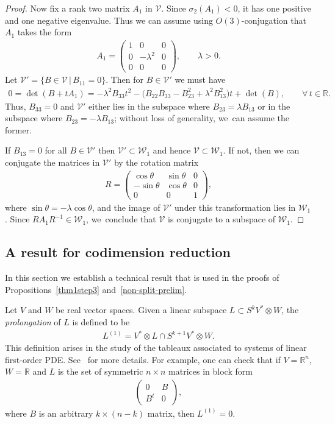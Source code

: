 \documentclass[10pt,a4paper]{amsart}
\def\R{\mathbb{R}}
\def\V{\mathscr{V}}
\def\W{\mathscr{W}}
\numberwithin{equation}{section}
\begin{document}
\begin{proof}
Now fix a rank two matrix $A_1$ in $\V$. Since $\sigma_2 (A_1) < 0$, it has one positive and one negative eigenvalue. Thus we can assume using $O(3)$-conjugation that $A_1$ takes the form
\begin{gather*}
A_1 = \begin{pmatrix} 1 & 0 & 0 \\ 0 & -\lambda^2 & 0 \\ 0 & 0 & 0 \end{pmatrix} , \qquad \lambda > 0.
\end{gather*}
Let $\V' = \{ B \in \V \,|\, B_{11}=0\}$. Then for $B \in \V'$ we must have
\begin{gather*}
0 = \det(B + t A_1) = -\lambda^2 B_{33}t^2 - \big(B_{22}B_{33} - B_{23}^2 + \lambda^2 B_{13}^2\big)t + \det(B), \qquad \forall\, t \in \R.
\end{gather*}
Thus, $B_{33}=0$ and $\V'$ either lies in the subspace where $B_{23}=\lambda B_{13}$ or in the subspace where $B_{23}=-\lambda B_{13}$; without loss of generality, we~can assume the former.

If $B_{13}=0$ for all $B\in \V'$ then $\V' \subset \W_1$ and hence $\V \subset \W_1$. If not, then we can conjugate the matrices in $\V'$ by the rotation matrix
\begin{gather*}
R = \begin{pmatrix} \cos \theta & \sin \theta & 0 \\ -\sin\theta & \cos \theta & 0 \\ 0 & 0 & 1\end{pmatrix} ,
\end{gather*}
where $\sin\theta=-\lambda \cos \theta$, and the image of $\V'$ under this transformation lies in $\W_1$. Since $R A_1 R^{-1} \in \W_1$, we~conclude that $\V$ is conjugate to a subspace of $\W_1$.
\end{proof}

\subsection{A result for codimension reduction} \label{codim-reduction-sec}

In this section we establish a technical result that is used in the proofs of Propositions~\ref{thm1step3} and~\ref{non-split-prelim}.

Let $V$ and $W$ be real vector spaces. Given a linear subspace $L \subset S^k V^* \otimes W$, the \emph{prolongation} of $L$ is defined to be
\begin{gather*}
L^{(1)} = V^* \otimes L \cap S^{k+1} V^* \otimes W.
\end{gather*}
This definition arises in the study of the tableaux associated to systems of linear first-order PDE. See~\cite[Chapter VIII]{BCG3} for more details. For example, one can check that if $V=\R^n$, $W=\R$ and $L$ is the set of symmetric $n\times n$ matrices in block form{\samepage
\begin{gather*}
\begin{pmatrix} 0 & B \\ B^t & 0 \end{pmatrix},
\end{gather*}
where $B$ is an arbitrary $k \times (n-k)$ matrix, then $L^{(1)} = 0$.}
\end{document}
